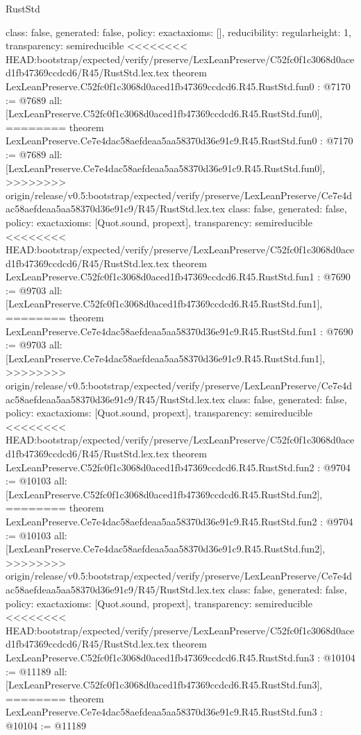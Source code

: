 \begin{lexlean}{RustStd}
\begin{coremodule}
{\begin{coremodule}
{{{  class: false,
  generated: false,
  policy: exact{axioms: []},
  reducibility: regular{height: 1},
  transparency: semireducible
}
<<<<<<<< HEAD:bootstrap/expected/verify/preserve/LexLeanPreserve/C52fc0f1c3068d0aced1fb47369ccdcd6/R45/RustStd.lex.tex
theorem LexLeanPreserve.C52fc0f1c3068d0aced1fb47369ccdcd6.R45.RustStd.fun0 : @7170 := @7689 {
  all: [LexLeanPreserve.C52fc0f1c3068d0aced1fb47369ccdcd6.R45.RustStd.fun0],
========
theorem LexLeanPreserve.Ce7e4dac58aefdeaa5aa58370d36e91c9.R45.RustStd.fun0 : @7170 := @7689 {
  all: [LexLeanPreserve.Ce7e4dac58aefdeaa5aa58370d36e91c9.R45.RustStd.fun0],
>>>>>>>> origin/release/v0.5:bootstrap/expected/verify/preserve/LexLeanPreserve/Ce7e4dac58aefdeaa5aa58370d36e91c9/R45/RustStd.lex.tex
  class: false,
  generated: false,
  policy: exact{axioms: [Quot.sound, propext]},
  transparency: semireducible
}
<<<<<<<< HEAD:bootstrap/expected/verify/preserve/LexLeanPreserve/C52fc0f1c3068d0aced1fb47369ccdcd6/R45/RustStd.lex.tex
theorem LexLeanPreserve.C52fc0f1c3068d0aced1fb47369ccdcd6.R45.RustStd.fun1 : @7690 := @9703 {
  all: [LexLeanPreserve.C52fc0f1c3068d0aced1fb47369ccdcd6.R45.RustStd.fun1],
========
theorem LexLeanPreserve.Ce7e4dac58aefdeaa5aa58370d36e91c9.R45.RustStd.fun1 : @7690 := @9703 {
  all: [LexLeanPreserve.Ce7e4dac58aefdeaa5aa58370d36e91c9.R45.RustStd.fun1],
>>>>>>>> origin/release/v0.5:bootstrap/expected/verify/preserve/LexLeanPreserve/Ce7e4dac58aefdeaa5aa58370d36e91c9/R45/RustStd.lex.tex
  class: false,
  generated: false,
  policy: exact{axioms: [Quot.sound, propext]},
  transparency: semireducible
}
<<<<<<<< HEAD:bootstrap/expected/verify/preserve/LexLeanPreserve/C52fc0f1c3068d0aced1fb47369ccdcd6/R45/RustStd.lex.tex
theorem LexLeanPreserve.C52fc0f1c3068d0aced1fb47369ccdcd6.R45.RustStd.fun2 : @9704 := @10103 {
  all: [LexLeanPreserve.C52fc0f1c3068d0aced1fb47369ccdcd6.R45.RustStd.fun2],
========
theorem LexLeanPreserve.Ce7e4dac58aefdeaa5aa58370d36e91c9.R45.RustStd.fun2 : @9704 := @10103 {
  all: [LexLeanPreserve.Ce7e4dac58aefdeaa5aa58370d36e91c9.R45.RustStd.fun2],
>>>>>>>> origin/release/v0.5:bootstrap/expected/verify/preserve/LexLeanPreserve/Ce7e4dac58aefdeaa5aa58370d36e91c9/R45/RustStd.lex.tex
  class: false,
  generated: false,
  policy: exact{axioms: [Quot.sound, propext]},
  transparency: semireducible
}
<<<<<<<< HEAD:bootstrap/expected/verify/preserve/LexLeanPreserve/C52fc0f1c3068d0aced1fb47369ccdcd6/R45/RustStd.lex.tex
theorem LexLeanPreserve.C52fc0f1c3068d0aced1fb47369ccdcd6.R45.RustStd.fun3 : @10104 := @11189 {
  all: [LexLeanPreserve.C52fc0f1c3068d0aced1fb47369ccdcd6.R45.RustStd.fun3],
========
theorem LexLeanPreserve.Ce7e4dac58aefdeaa5aa58370d36e91c9.R45.RustStd.fun3 : @10104 := @11189 {
}}}}}}}
\end{coremodule}}
\end{coremodule}
\end{lexlean}
